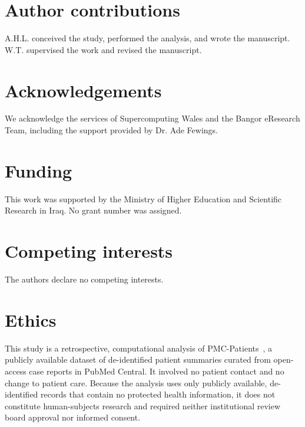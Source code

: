 \documentclass[pdflatex,sn-mathphys-num]{sn-jnl}%
\theoremstyle{thmstyleone}%
\theoremstyle{thmstyletwo}%
\theoremstyle{thmstylethree}%
\begin{document}
\section*{Author contributions}
A.H.L. conceived the study, performed the analysis, and wrote the
manuscript. W.T. supervised the work and revised the manuscript.


\section*{Acknowledgements}
We acknowledge the services of Supercomputing Wales and the Bangor
eResearch Team, including the support provided by Dr. Ade Fewings.

\section*{Funding}
This work was supported by the Ministry of Higher Education and Scientific
Research in Iraq. No grant number was assigned.

\section*{Competing interests}
The authors declare no competing interests.

\section*{Ethics}
This study is a retrospective, computational analysis of PMC-Patients~\cite{zhao2023large}, a publicly
available dataset of de-identified patient summaries curated from open-access case reports in PubMed
Central. It involved no patient contact and no change to patient care. Because the analysis uses only
publicly available, de-identified records that contain no protected health information, it does not
constitute human-subjects research and required neither institutional review board approval nor
informed consent.

%
%
\end{document}
